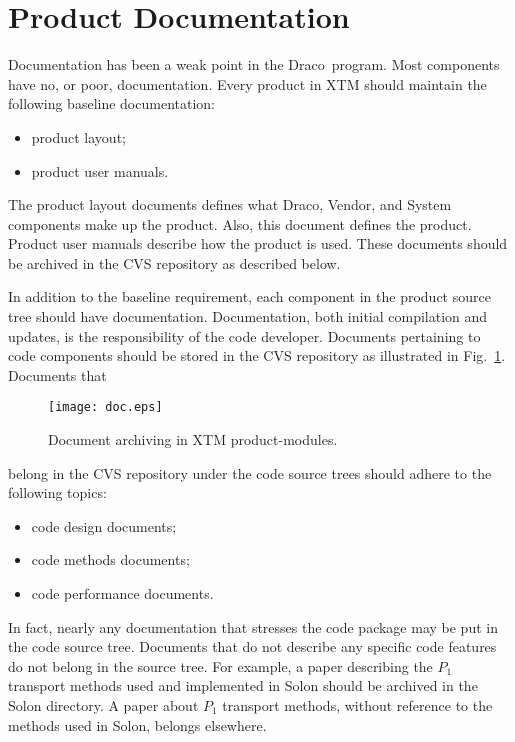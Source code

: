 \documentclass[11pt]{rnote}
\newcommand{\draco}{\textsf{Draco}}
\newcommand{\pkg}[1]{\textsf{#1}}
\begin{document}

\section{Product Documentation}
\label{sec:document}

Documentation has been a weak point in the \draco\ program.  Most
components have no, or poor, documentation. Every product in XTM
should maintain the following baseline documentation:
\begin{itemize}
\item product layout;
\item product user manuals.
\end{itemize}
The product layout documents defines what \draco, \pkg{Vendor},
and \pkg{System} components make up the product.  Also, this document
defines the product.  Product user manuals describe how the product
is used.  These documents should be archived in the CVS repository as
described below.

In addition to the baseline requirement, each component in the product
source tree should have documentation.  Documentation, both initial
compilation and updates, is the responsibility of the code developer.
Documents pertaining to code components should be stored in the CVS
repository as illustrated in Fig.~\ref{fig:doc}.  Documents that
\begin{figure}
  \centerline{\texttt{[image: doc.eps]}}
  \caption{Document archiving in XTM product-modules.}
  \label{fig:doc}
\end{figure}
belong in the CVS repository under the code source trees should
adhere to the following topics:
\begin{itemize}
\item code design documents;
\item code methods documents;
\item code performance documents.
\end{itemize}
In fact, nearly any documentation that stresses the code package may
be put in the code source tree.  Documents that do not describe any
specific code features do not belong in the source tree.  For example, 
a paper describing the $P_{1}$ transport methods used and implemented
in \pkg{Solon} should be archived in the \pkg{Solon} directory.  A
paper about $P_{1}$ transport methods, without reference to the
methods used in \pkg{Solon}, belongs elsewhere.
\end{document}
